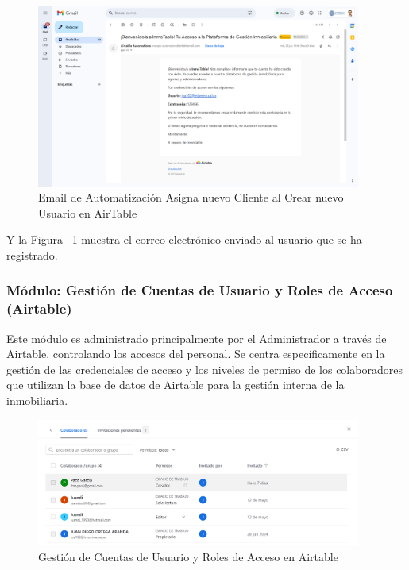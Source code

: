 \begin{enumerate}
    \begin{figure}[H]
        \begin{center}
            \includegraphics[width = 0.95\textwidth]{Figuras/emailautomatizacionasignanuevoclientealcrearnuevousuario.png}
        \end{center}
        \caption{\label{fig:emailautomatizacionasignanuevoclientealcrearnuevousuario} Email de Automatización Asigna nuevo Cliente al Crear nuevo Usuario en AirTable}
    \end{figure}

    Y la Figura ~\ref{fig:emailautomatizacionasignanuevoclientealcrearnuevousuario} muestra el correo electrónico enviado al usuario que se ha registrado.

\end{enumerate}


\subsubsection{Módulo: Gestión de Cuentas de Usuario y Roles de Acceso (Airtable)}

Este módulo es administrado principalmente por el Administrador a través de Airtable, controlando los accesos del personal. Se centra específicamente en la gestión de las credenciales de acceso y los niveles de permiso de los colaboradores que utilizan la base de datos de Airtable para la gestión interna de la inmobiliaria.

\begin{figure}[H]
    \begin{center}
        \includegraphics[width = 0.95\textwidth]{Figuras/gestionusuariosinternosrolesairtable.png}
    \end{center}
    \caption{\label{fig:gestionusuariosinternosrolesairtable} Gestión de Cuentas de Usuario y Roles de Acceso en Airtable}
\end{figure}

